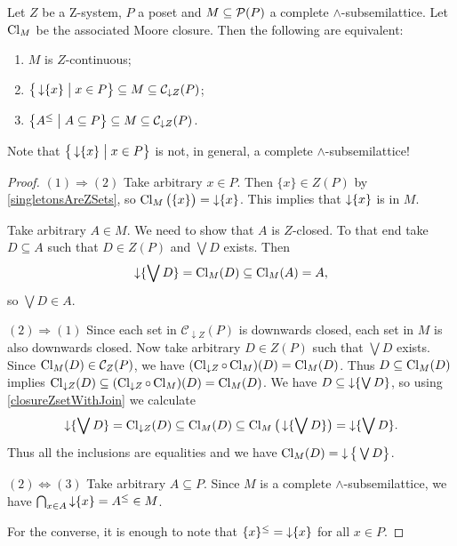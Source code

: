 \begin{proposition} \label{ZcontinuityIntersectionSystem}
Let $Z$ be a $\mathrm{Z}$-system, $P$ a poset and $M \subseteq \operatorname{\mathcal{P}}(P)$ a complete $\wedge$-subsemilattice. Let $\operatorname{Cl}_{M}$ be the associated Moore closure. Then the following are equivalent:
\begin{enumerate}
\item $M$ is $Z$-continuous;
\item $\setbuilder[\big]{\downset\{x\}}{x\in P} \subseteq M \subseteq \mathcal{C}_{\downarrow Z}(P)$;
\item $\setbuilder{A^\leq}{A\subseteq P} \subseteq M \subseteq \mathcal{C}_{\downarrow Z}(P)$.
\end{enumerate}
\end{proposition}
Note that $\setbuilder[\big]{\downset\{x\}}{x\in P}$ is not, in general, a complete $\wedge$-subsemilattice! 
\begin{proof}
$(1) \Rightarrow (2)$ Take arbitrary $x\in P$. Then $\{x\}\in Z(P)$ by \ref{singletonsAreZSets}, so $\operatorname{Cl}_{M}\big(\{x\}\big) = \operatorname{\downarrow}\{x\}$. This implies that $\operatorname{\downarrow}\{x\}$ is in $M$.

Take arbitrary $A\in M$. We need to show that $A$ is $Z$-closed. To that end take $D\subseteq A$ such that $D\in Z(P)$ and $\bigvee D$ exists. Then
\[ \operatorname{\downarrow}\{\bigvee D\} = \operatorname{Cl}_{M}(D) \subseteq \operatorname{Cl}_{M}(A) = A, \]
so $\bigvee D \in A$.

$(2) \Rightarrow (1)$ Since each set in $\mathcal{C}_{\downarrow Z}(P)$ is downwards closed, each set in $M$ is also downwards closed. Now take arbitrary $D\in Z(P)$ such that $\bigvee D$ exists. Since $\operatorname{Cl}_{M}(D) \in \mathcal{C}_Z(P)$, we have $(\operatorname{Cl}_{\downarrow Z}\circ \operatorname{Cl}_{M})(D) = \operatorname{Cl}_{M}(D)$. Thus $D\subseteq \operatorname{Cl}_{M}(D)$ implies $\operatorname{Cl}_{\downarrow Z}(D) \subseteq (\operatorname{Cl}_{\downarrow Z}\circ \operatorname{Cl}_{M})(D) = \operatorname{Cl}_{M}(D)$. We have $D\subseteq \operatorname{\downarrow}\{\bigvee D\}$, so using \ref{closureZsetWithJoin} we calculate
\[ \operatorname{\downarrow}\{\bigvee D\} = \operatorname{Cl}_{\downarrow Z}(D) \subseteq \operatorname{Cl}_{M}(D) \subseteq \operatorname{Cl}_{M}\big(\operatorname{\downarrow} \{\bigvee D\}\big) = \operatorname{\downarrow}\{\bigvee D\}. \]
Thus all the inclusions are equalities and we have $\operatorname{Cl}_{M}(D) = \operatorname{\downarrow}\big\{\bigvee D\big\}$.

$(2) \Leftrightarrow (3)$ Take arbitrary $A\subseteq P$. Since $M$ is a complete $\wedge$-subsemilattice, we have $\bigcap_{x\in A}\operatorname{\downarrow}\{x\} = A^\leq \in M$.

For the converse, it is enough to note that $\{x\}^\leq = \operatorname{\downarrow}\{x\}$ for all $x\in P$.
\end{proof}
